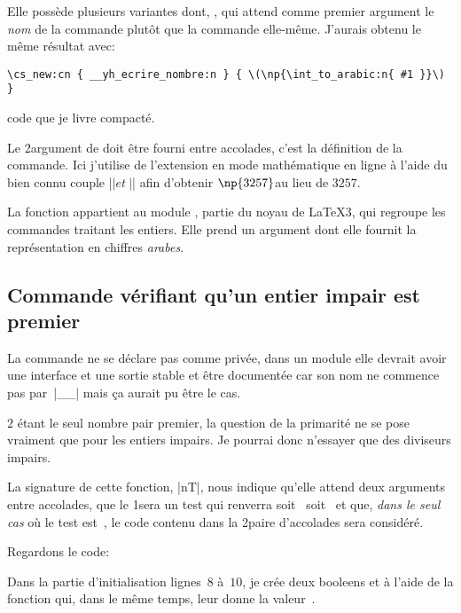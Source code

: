 Elle possède plusieurs variantes dont, \PX{},  qui
attend comme premier argument le \emph{nom} de la commande plutôt que
la commande elle-même. J'aurais obtenu le même résultat avec:
%
\begin{Verbatim}[frame=lines, framesep=0.75\baselineskip]
\cs_new:cn { __yh_ecrire_nombre:n } { \(\np{\int_to_arabic:n{ #1 }}\) }
\end{Verbatim}
%
code que je livre compacté.

Le 2\ieme argument de  doit être fourni entre
accolades, c'est la définition de la commande. Ici j'utilise
 de l'extension  en mode mathématique en
ligne \TO à l'aide du bien connu couple |\(| et~|\)| \TF  afin
d'obtenir \og \(\np{3257}\)\fg au lieu de \og \(3257\)\fg.

La \gls{fonction}  appartient au \gls{module}
, partie du noyau de \LaTeX3, qui regroupe les commandes
traitant les \glspl{entier}. Elle prend un argument dont elle fournit
la représentation en chiffres \emph{arabes}.

\subsection{Commande vérifiant qu'un entier impair est premier}
\label{sec:macro+impair+premier}

La commande  ne se déclare pas comme
privée, dans un \gls{module} elle devrait avoir une interface et une
sortie stable et être documentée car son nom ne commence pas par~|__|
mais ça aurait pu être le cas.

\(2\) étant le seul nombre pair premier, la question de la primarité
ne se pose vraiment que pour les entiers impairs. Je pourrai donc
n'essayer que des diviseurs impairs.

La \gls{signature} de cette \gls{fonction}, \CAD |nT|, nous indique
qu'elle attend deux arguments entre accolades, que le 1\ier sera un
test qui renverra soit~\VRAI{} soit~\FAUX{} et que, \emph{dans le seul
  cas} où le test est~\VRAI{}, le code contenu dans la 2\ieme paire
d'accolades sera considéré.

Regardons le code:
%

Dans la partie d'initialisation \TO lignes~\(8\) à~\(10\)\TF, je crée
deux \glspl{booleen} \TO {} et
\TF à l'aide de la \gls{fonction}
 qui, dans le même temps, leur donne la
valeur~\VRAI.

